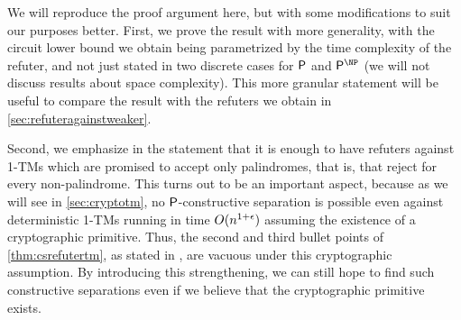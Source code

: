 \thmcsrefutertm*

We will reproduce the proof argument here, but with some modifications to suit our
purposes better. First, we prove the result with more generality, with the circuit lower 
bound we obtain being parametrized by the time complexity of the refuter, and not just
stated in two discrete cases for $\mathsf{P}$ and $\PTIME^\NP$ (we will not discuss results about space complexity). 
This more granular statement will be 
useful to compare the result with the refuters we obtain in \cref{sec:refuteragainstweaker}.

Second, we emphasize in the statement that it is enough to have refuters against 1-TMs which
are promised to accept only palindromes, that is, that reject for every non-palindrome. 
This turns out to be an important aspect, because as we will see in \cref{sec:cryptotm}, no
$\mathsf{P}$-constructive separation is possible even against deterministic 1-TMs running in time
$O(n^{1+\epsilon})$ assuming the existence of a cryptographic primitive. Thus, the second and third 
bullet points of \cref{thm:csrefutertm}, as stated in \cite{ConstructiveSeparations}, are 
vacuous under this cryptographic assumption. By introducing this strengthening, we can still
hope to find such constructive separations even if we believe that the cryptographic primitive exists. 

